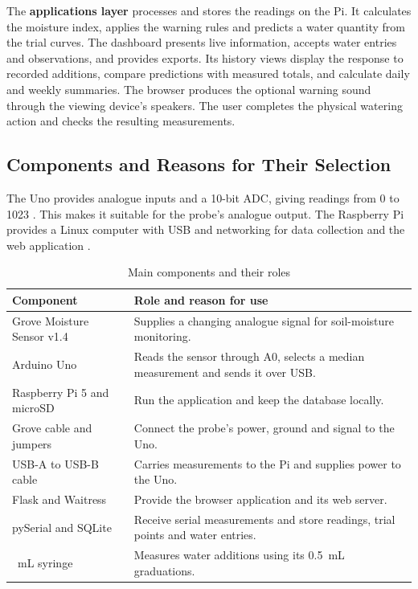 \documentclass[11pt,a4paper]{article}
\begin{document}
The \textbf{applications layer} processes and stores the readings on the Pi. It calculates the moisture index, applies the warning rules and predicts a water quantity from the trial curves. The dashboard presents live information, accepts water entries and observations, and provides exports. Its history views display the response to recorded additions, compare predictions with measured totals, and calculate daily and weekly summaries. The browser produces the optional warning sound through the viewing device's speakers. The user completes the physical watering action and checks the resulting measurements.

\subsection{Components and Reasons for Their Selection}

The Uno provides analogue inputs and a 10-bit ADC, giving readings from 0 to 1023 \cite{ref9}. This makes it suitable for the probe's analogue output. The Raspberry Pi provides a Linux computer with USB and networking for data collection and the web application \cite{ref17}.

\begin{table}[htbp]
\centering
\caption{Main components and their roles}
\label{tab:components}
\begin{tabular}{|>{\raggedright\arraybackslash}p{4.0cm}|>{\raggedright\arraybackslash}p{10.7cm}|}
\hline
\textbf{Component} & \textbf{Role and reason for use} \\ \hline
Grove Moisture Sensor v1.4 & Supplies a changing analogue signal for soil-moisture monitoring. \\ \hline
Arduino Uno & Reads the sensor through A0, selects a median measurement and sends it over USB. \\ \hline
Raspberry Pi 5 and microSD & Run the application and keep the database locally. \\ \hline
Grove cable and jumpers & Connect the probe's power, ground and signal to the Uno. \\ \hline
USB-A to USB-B cable & Carries measurements to the Pi and supplies power to the Uno. \\ \hline
Flask and Waitress & Provide the browser application and its web server. \\ \hline
pySerial and SQLite & Receive serial measurements and store readings, trial points and water entries. \\ \hline
5~mL syringe & Measures water additions using its 0.5~mL graduations. \\ \hline
\end{tabular}
\end{table}
\end{document}
